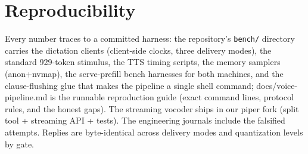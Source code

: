 \documentclass[journal]{IEEEtran}
\begin{document}

%


\appendices
\section{Reproducibility}
Every number traces to a committed harness: the repository's \verb|bench/| directory carries the dictation clients (client-side clocks, three delivery modes), the standard 929-token stimulus, the TTS timing scripts, the memory samplers (anon+nvmap), the serve-prefill bench harnesses for both machines, and the clause-flushing glue that makes the pipeline a single shell command; docs/voice-pipeline.md is the runnable reproduction guide (exact command lines, protocol rules, and the honest gaps). The streaming vocoder ships in our piper fork (split tool + streaming API + tests). The engineering journals include the falsified attempts. Replies are byte-identical across delivery modes and quantization levels by gate.


\ifCLASSOPTIONcaptionsoff
  \newpage
\fi



\end{document}
